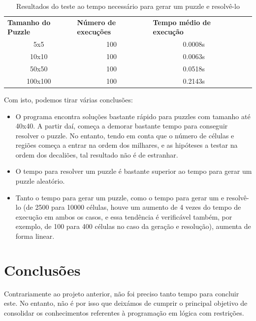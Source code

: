 \documentclass[runningheads,a4paper]{llncs}
\begin{document}
\begin{table}[]
\centering
\caption{Resultados do teste ao tempo necessário para gerar um puzzle e resolvê-lo}
\begin{tabular}{cccll}
\multicolumn{1}{l}{\textbf{Tamanho do Puzzle}} & \multicolumn{1}{l}{\textbf{Número de execuções}} & \multicolumn{1}{l}{\textbf{Tempo médio de execução}} &  &  \\
5x5                                            & 100                                              & 0.0008s                                              &  &  \\
10x10                                          & 100                                              & 0.0063s                                              &  &  \\
50x50                                          & 100                                              & 0.0518s                                              &  &  \\
100x100                                        & 100                                              & 0.2143s                                              &  & 
\end{tabular}
\end{table}

Com isto, podemos tirar várias conclusões:

\begin{itemize}
\item O programa encontra soluções bastante rápido para puzzles com tamanho até 40x40. A partir daí, começa a demorar bastante tempo para conseguir resolver o puzzle. No entanto, tendo em conta que o número de células e regiões começa a entrar na ordem dos milhares, e as hipóteses a testar na ordem dos decaliões, tal resultado não é de estranhar.
\item O tempo para resolver um puzzle é bastante superior ao tempo para gerar um puzzle aleatório.
\item Tanto o tempo para gerar um puzzle, como o tempo para gerar um e resolvê-lo (de 2500 para 10000 células, houve um aumento de 4 vezes do tempo de execução em ambos os casos, e essa tendência é verificável também, por exemplo, de 100 para 400 células no caso da geração e resolução), aumenta de forma linear.
\end{itemize}

\section{Conclusões}
Contrariamente ao projeto anterior, não foi preciso tanto tempo para concluir este. No entanto, não é por isso que deixámos de cumprir o principal objetivo de consolidar os conhecimentos referentes à programação em lógica com restrições.
\end{document}
